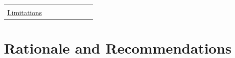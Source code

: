 \documentclass[smallextended]{svjour3}
\newcommand{\should}{\textbf{should}\xspace}
\newcommand{\iconM}{\usebox{\iconMbox}\xspace}
\newcommand{\iconS}{\usebox{\iconSbox}\xspace}
\newcommand{\iconM}{●\xspace}
\newcommand{\iconS}{○\xspace}
\newcommand{\newtools}{\hyperref[sec:llms-for-new-software-engineering-tools]{\mbox{\emph{LLMs for Tools}}}\xspace}
\newcommand{\newtools}{\href{/study-types/tools/}{\emph{LLMs for Tools}}\xspace}
\begin{document}
\begin{appendices}
\begin{center}
\begin{tabular}{@{} l c c c c c c c @{}}
  & \iconS %
  & \iconS %
  \\
\hyperref[sec:report-limitations-and-mitigations]{Limitations}
  & \iconM %
  & \iconM %
  & \iconM %
  & \iconM %
  & \iconM %
  & \iconM %
  & \iconM %
  \\
\bottomrule
\end{tabular}
\end{center}
\space%

\section{Rationale and Recommendations}
\nopagebreak


\end{appendices}
\end{document}
